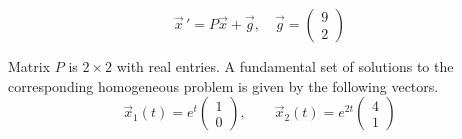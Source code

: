 \[\vec{x}\, ' = P\vec {x} + \vec g, \quad \vec g = \begin{pmatrix} 9\\2\end{pmatrix}\] 

Matrix $P$ is $2\times2$ with real entries. A fundamental set of solutions to the corresponding homogeneous problem is given by the following vectors.   
\[\vec{x}_{1}(t)=e^{t}\begin{pmatrix}1\\0\end{pmatrix},\qquad \vec{x}_{2}(t)=e^{2t}\begin{pmatrix}4\\1\end{pmatrix}\]  

    
